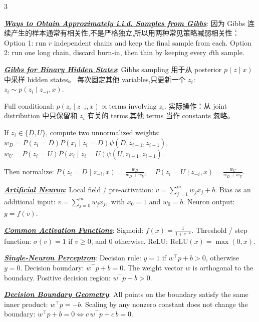 \documentclass[12pt]{article}
\newcommand{\bulletPoint}[1]{\underline{\textit{\textbf{#1}}}}
\begin{document}
\begin{multicols*}{3}

\bulletPoint{Ways to Obtain Approximately i.i.d. Samples from Gibbs}:
因为 Gibbs 连续产生的样本通常有相关性,不是严格独立,所以用两种常见策略减弱相关性：
Option 1:
run $r$ independent chains and keep the final sample from each.
Option 2:
run one long chain, discard burn-in, then thin by keeping every $d$th sample.


\bulletPoint{Gibbs for Binary Hidden States}:
Gibbs sampling 用于从 posterior $p(z\mid x)$ 中采样 hidden states。
每次固定其他 variables,只更新一个 $z_i$:
$
z_i \sim p(z_i\mid z_{-i},x).
$

Full conditional:
$
p(z_i\mid z_{-i},x)
\propto
\text{terms involving }z_i.
$
实际操作：从 joint distribution 中只保留和 $z_i$ 有关的 terms,其他 terms 当作 constants 忽略。

If $z_i\in\{D,U\}$, compute two unnormalized weights:
$
w_D
=
P(z_i=D)P(x_i\mid z_i=D)
\psi(D,z_{i-1},z_{i+1}),
$
$
w_U
=
P(z_i=U)P(x_i\mid z_i=U)
\psi(U,z_{i-1},z_{i+1}).
$

Then normalize:
$
P(z_i=D\mid z_{-i},x)=\frac{w_D}{w_D+w_U},
\quad
P(z_i=U\mid z_{-i},x)=\frac{w_U}{w_D+w_U}.
$





\bulletPoint{Artificial Neuron}:
Local field / pre-activation:
$v=\sum_{j=1}^m w_jx_j+b.$
Bias as an additional input:
$v=\sum_{j=0}^m w_jx_j,$
with $x_0=1$ and $w_0=b.$
Neuron output:
$y=f(v).$

\bulletPoint{Common Activation Functions}:
Sigmoid:
$f(x)=\frac{1}{1+e^{-x}}.$
Threshold / step function:
$\sigma(v)=1$ if $v\ge 0$, and $0$ otherwise.
ReLU:
$\mathrm{ReLU}(x)=\max(0,x).$

\bulletPoint{Single-Neuron Perceptron}:
Decision rule:
$y=1$ if $w^\top p+b>0$, otherwise $y=0.$
Decision boundary:
$w^\top p+b=0.$
The weight vector $w$ is orthogonal to the boundary.
Positive decision region:
$w^\top p+b>0.$

\bulletPoint{Decision Boundary Geometry}:
All points on the boundary satisfy the same inner product:
$w^\top p=-b.$
Scaling by any nonzero constant does not change the boundary:
$w^\top p+b=0 \iff c\,w^\top p+c\,b=0.$


\end{multicols*}
\end{document}
